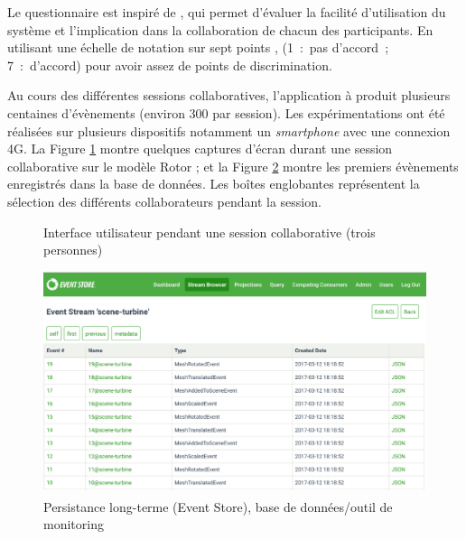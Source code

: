 Le questionnaire est inspiré de \cite{Lewis1995}, qui permet d'évaluer la facilité 
d'utilisation du système et l'implication dans la collaboration de chacun des 
participants. En utilisant une échelle de notation sur sept points \cite{Lewis1993}, 
(1~:~pas d'accord~; 7~:~d'accord) pour avoir assez de points de discrimination.



Au cours des différentes sessions collaboratives, l'application à produit plusieurs 
centaines d'évènements (environ 300 par session). Les expérimentations ont été 
réalisées sur plusieurs dispositifs notamment un \textit{smartphone} avec une 
connexion 4G. 
La Figure \ref{fig:screenshots} montre quelques captures d'écran durant une 
session collaborative sur le modèle Rotor ; et la Figure \ref{fig:ui4} montre les 
premiers évènements enregistrés dans la base de données. 
Les boîtes englobantes représentent la sélection des différents collaborateurs 
pendant la session.
\begin{figure}[ht]
	\centering
	
	\hfill
	\hfill
	\hfill
	\caption{Interface utilisateur pendant une session collaborative (trois personnes)}
	\label{fig:screenshots}
\end{figure}

\begin{figure}[ht]
	\centering
	\includegraphics[width=\textwidth]{eps/eventstore.eps}
	\caption{Persistance long-terme (Event Store\textsuperscript{\textregistered}), 
		base de données/outil de monitoring}
	\label{fig:ui4}
\end{figure}

